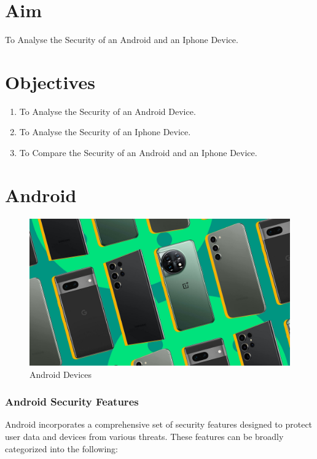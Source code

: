 \documentclass[11pt]{article}
\begin{document}
\tableofcontents
\thispagestyle{empty}
\clearpage

\setcounter{page}{1}

\section{Aim}
To Analyse the Security of an Android and an Iphone Device.
\section{Objectives}
\begin{enumerate}
      \item To Analyse the Security of an Android Device.
      \item To Analyse the Security of an Iphone Device.
      \item To Compare the Security of an Android and an Iphone Device.
\end{enumerate}

\section{Android}

\begin{figure}[H]
      \centering
      \includegraphics[width=.75\textwidth]{android/android_4.jpg}
      \caption{Android Devices}
\end{figure}

\subsubsection{Android Security Features}

Android incorporates a comprehensive set of security features designed to
protect user data and devices from various threats. These features can be
broadly categorized into the following:
\end{document}
